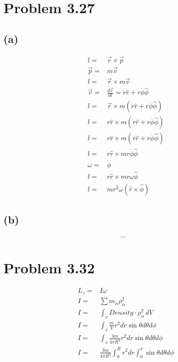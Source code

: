 \documentclass[12pt, a4paper]{article}
\begin{document}
\pagebreak
\section*{Problem 3.27}
\subsection*{(a)}
\begin{align*}
l =& \vec{r} \times \vec{p}
\\
\vec{p} =& m\vec{v}
\\
l =& \vec{r} \times m\vec{v}
\\
\vec{v} =& \frac{d\vec{r}}{dt} = \dot{r}\hat{r} + r\dot{\phi}\hat{\phi}
\\
l =& \vec{r} \times m(\dot{r}\hat{r} + r\dot{\phi}\hat{\phi})
\\
l =& r\hat{r} \times m(\dot{r}\hat{r} + r\dot{\phi}\hat{\phi})
\\
l =& r\hat{r} \times m(\dot{r}\hat{r} + r\dot{\phi}\hat{\phi})
\\
l =& r\hat{r} \times m r\dot{\phi}\hat{\phi}
\\
\omega =& \dot{\phi}
\\
l =& r\hat{r} \times m r\omega\hat{\phi}
\\
l =&  \boxed{ m r^2\omega(\hat{r}\times\hat{\phi}) }
\end{align*}
\subsection*{(b)}
\begin{align*}
\dots &
\end{align*}





\pagebreak
\section*{Problem 3.32}
\begin{align*}
L_z =& I\omega
\\
I =& \sum m_\alpha \rho_\alpha^2
\\
I =& \int_v \textit{Density} \cdot \rho_\alpha^2 \, dV
\\
I =& \int_v \frac{m}{V} r^2 dr \sin\theta d\theta d\phi
\\
I =& \int_v \frac{3m}{4\pi R^3} r^2 dr \sin\theta d\theta d\phi
\\
I =& \frac{3m}{4\pi R^3} \int_0^R r^2 dr 
\int_0^\pi\sin\theta d\theta d\phi
\\
\end{align*}
\end{document}
